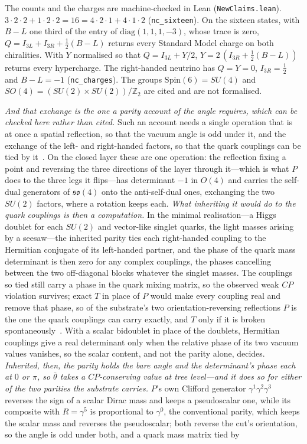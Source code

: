 \documentclass[11pt]{article}
\newcommand{\so}{\mathfrak{so}}
\begin{document}
The counts and the charges are machine-checked in Lean (\texttt{NewClaims.lean}). $3\cdot2\cdot2+1\cdot2\cdot2=16=4\cdot2\cdot1+4\cdot1\cdot2$ (\texttt{nc\_sixteen}). On the sixteen states, with $B{-}L$ one third of the entry of $\mathrm{diag}(1,1,1,-3)$, whose trace is zero, $Q=I_{3L}+I_{3R}+\tfrac{1}{2}(B{-}L)$ returns every Standard Model charge on both chiralities. With $Y$ normalised so that $Q=I_{3L}+Y/2$, $Y=2\,(I_{3R}+\tfrac{1}{2}(B{-}L))$ returns every hypercharge. The right-handed neutrino has $Q=Y=0$, $I_{3R}=\tfrac{1}{2}$ and $B{-}L=-1$ (\texttt{nc\_charges}). The groups $\mathrm{Spin}(6)=SU(4)$ and $SO(4)=(SU(2)\times SU(2))/\mathbb{Z}_{2}$ are cited and are not formalised.

\emph{And that exchange is the one a parity account of the angle requires, which can be checked here rather than cited.} Such an account needs a single operation that is at once a spatial reflection, so that the vacuum angle is odd under it, and the exchange of the left- and right-handed factors, so that the quark couplings can be tied by it~\cite{BabuMohapatra1990}. On the closed layer these are one operation: the reflection fixing a point and reversing the three directions of the layer through it---which is what $P$ does to the three legs it flips---has determinant $-1$ in $O(4)$ and carries the self-dual generators of $\so(4)$ onto the anti-self-dual ones, exchanging the two $SU(2)$ factors, where a rotation keeps each. \emph{What inheriting it would do to the quark couplings is then a computation.} In the minimal realisation---a Higgs doublet for each $SU(2)$ and vector-like singlet quarks, the light masses arising by a seesaw---the inherited parity ties each right-handed coupling to the Hermitian conjugate of its left-handed partner, and the phase of the quark mass determinant is then zero for any complex couplings, the phases cancelling between the two off-diagonal blocks whatever the singlet masses. The couplings so tied still carry a phase in the quark mixing matrix, so the observed weak $CP$ violation survives; exact $T$ in place of $P$ would make every coupling real and remove that phase, so of the substrate's two orientation-reversing reflections $P$ is the one the quark couplings can carry exactly, and $T$ only if it is broken spontaneously~\cite{Nelson1984,Barr1984}. With a scalar bidoublet in place of the doublets, Hermitian couplings give a real determinant only when the relative phase of its two vacuum values vanishes, so the scalar content, and not the parity alone, decides. \emph{Inherited, then, the parity holds the bare angle and the determinant's phase each at $0$ or $\pi$, so $\bar\theta$ takes a $CP$-conserving value at tree level---and it does so for either of the two parities the substrate carries.} $P$'s own Clifford generator $\gamma^{1}\gamma^{2}\gamma^{3}$ reverses the sign of a scalar Dirac mass and keeps a pseudoscalar one, while its composite with $R=\gamma^{5}$ is proportional to $\gamma^{0}$, the conventional parity, which keeps the scalar mass and reverses the pseudoscalar; both reverse the cut's orientation, so the angle is odd under both, and a quark mass matrix tied by 
\end{document}
